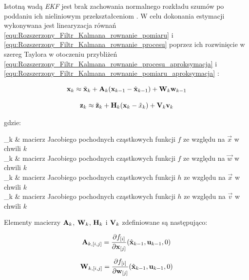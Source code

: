 Istotną wadą \textit{EKF} jest brak zachowania normalnego rozkładu szumów po poddaniu ich nieliniowym przekształceniom \cite{Welch1995}. W celu dokonania estymacji wykonywana jest linearyzacja równań \ref{equ:Rozszerzony_Filtr_Kalmana_rownanie_pomiaru} i \ref{equ:Rozszerzony_Filtr_Kalmana_rownanie_procesu} poprzez ich rozwinięcie w szereg Taylora w otoczeniu przybliżeń \ref{equ:Rozszerzony_Filtr_Kalmana_rownanie_procesu_aproksymacja} i \ref{equ:Rozszerzony_Filtr_Kalmana_rownanie_pomiaru_aproksymacja} \cite{Welch1995}:

\begin{equation}
\label{equ:Rozszerzony_Filtr_Kalmana_rownanie_procesu_Taylor}
	\mathbf{x}_k \approx \tilde{\mathbf{x}}_k + \mathbf{A}_k(\mathbf{x}_{k-1} - \hat{\mathbf{x}}_{k-1}) + \mathbf{W}_k\mathbf{w}_{k-1}
\end{equation}

\begin{equation}
\label{equ:Rozszerzony_Filtr_Kalmana_rownanie_pomiaru_Taylor}
	\mathbf{z}_k \approx \tilde{\mathbf{z}}_k + \mathbf{H}_k(\mathbf{x}_k - \tilde{x}_k) + \mathbf{V}_k\mathbf{v}_k
\end{equation}

\noindent
gdzie:

\begin{conditions}
	_k & macierz Jacobiego pochodnych cząstkowych funkcji $f$ ze względu na $\vec{x}$ w chwili $k$ \\
	_k & macierz Jacobiego pochodnych cząstkowych funkcji $f$ ze względu na $\vec{w}$ w chwili $k$ \\
	_k & macierz Jacobiego pochodnych cząstkowych funkcji $h$ ze względu na $\vec{x}$ w chwili $k$ \\
	_k & macierz Jacobiego pochodnych cząstkowych funkcji $h$ ze względu na $\vec{v}$ w chwili $k$ \\
\end{conditions}

\noindent
Elementy macierzy $\mathbf{A}_k$, $\mathbf{W}_k$, $\mathbf{H}_k$ i $\mathbf{V}_k$ zdefiniowane są następująco:

\begin{equation}
\label{equ:Rozszerzony_Filtr_Kalmana_macierz_A}
	\mathbf{A}_{k,[i,j]} = \frac{\partial f_{[i]}}{\partial \mathbf{x}_{[j]}} (\hat{\mathbf{x}}_{k-1}, \mathbf{u}_{k-1}, 0)
\end{equation}

\begin{equation}
\label{equ:Rozszerzony_Filtr_Kalmana_macierz_W}
	\mathbf{W}_{k,[i,j]} = \frac{\partial f_{[i]}}{\partial \mathbf{w}_{[j]}} (\hat{\mathbf{x}}_{k-1}, \mathbf{u}_{k-1}, 0)
\end{equation}

